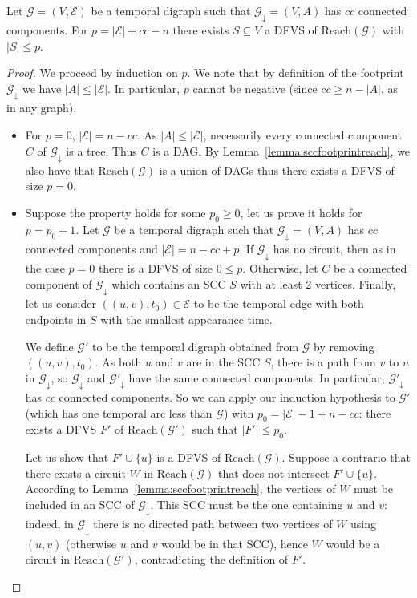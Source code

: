 \documentclass[11pt]{article}%
\begin{document}
  \begin{lemma}
  \label{lemma:fvs}
  Let $\mathcal G=(V,\mathcal{E})$ be a temporal digraph such that $\mathcal G_{\downarrow}=(V,A)$ has $cc$ connected components. For $p = |\mathcal E| + cc - n$ there exists $S \subseteq V$ a DFVS of $\mathrm{Reach}(\mathcal G)$ with $|S| \leq p$.
  \end{lemma}
  \begin{proof}
    We proceed by induction on $p$. We note that by definition of the footprint $\mathcal G_{\downarrow}$ we have $|A|\leq |\mathcal{E}|$. In particular, $p$ cannot be negative (since $cc\geq n-|A|$, as in any graph). 
    \begin{itemize}
      \item For $p=0$, $|\mathcal{E}|=n-cc$. As $|A|\leq |\mathcal{E}|$, necessarily every connected component  $C$ of $\mathcal G_{\downarrow}$ is a tree. Thus $C$ is a DAG. By Lemma~\ref{lemma:sccfootprintreach}, we also have that $\mathrm{Reach}(\mathcal G)$ is a union of DAGs thus there exists a DFVS of size $p=0$.
      \item Suppose the property holds for some $p_0\geq 0$, let us prove it holds for $p=p_0+1$. Let $\mathcal G$ be a temporal digraph such that $\mathcal G_{\downarrow}=(V,A)$ has $cc$ connected components and $|\mathcal{E}|=n-cc+p$. If $\mathcal G_{\downarrow}$ has no circuit, then as in the case $p=0$ there is a DFVS of size $0\leq p$. Otherwise, let $C$ be a connected component of $\mathcal G_{\downarrow}$ which contains an SCC $S$ with at least 2 vertices. Finally, let us consider $((u,v),t_0) \in \mathcal E$ to be the temporal edge with both endpoints in $S$ with the smallest appearance time.
        
        We define $\mathcal G'$ to be the temporal digraph obtained from $\mathcal G$ by removing  $((u,v),t_0)$. As both $u$ and $v$ are in the SCC $S$, there is a path from $v$ to $u$ in $\mathcal G_\downarrow$, so $\mathcal G_\downarrow$ and $\mathcal G'_\downarrow$ have the same connected components. In particular, $\mathcal G'_\downarrow$ has $cc$ connected components. So we can apply our induction hypothesis to $\mathcal G'$ (which has one temporal arc less than $\mathcal G$) with $p_0=|\mathcal E|-1+n-cc$: there exists a DFVS $F'$ of $\mathrm{Reach}(\mathcal G')$ such that $|F'| \leq p_0$.
    
    Let us show that $F' \cup \{u\}$ is a DFVS of $\mathrm{Reach}(\mathcal G)$. Suppose a contrario that there exists a circuit $W$ in $\mathrm{Reach}(\mathcal G)$ that does not intersect $F' \cup \{u\}$. According to Lemma~\ref{lemma:sccfootprintreach}, the vertices of $W$ must be included in an SCC of $\mathcal G_\downarrow$. This SCC must be the one containing $u$ and $v$: indeed, in $\mathcal G_\downarrow$ there is no directed path between two vertices of $W$ using $(u,v)$ (otherwise $u$ and $v$ would be in that SCC), hence $W$ would be a circuit in $\mathrm{Reach}(\mathcal G')$, contradicting the definition of $F'$. 
    

\end{itemize}
\end{proof}
\end{document}
